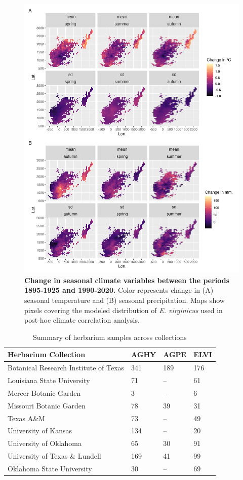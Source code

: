 \documentclass[11pt]{article}
\begin{document}
\begin{figure}[H]
	\centering
	\includegraphics[width = .8\linewidth]{../Plots/ELVI_climate_change_plot.png}
	\caption{\textbf{Change in seasonal climate variables between the periods 1895-1925 and 1990-2020.} Color represents change in (A) seasonal temperature and (B) seasonal precipitation. Maps show pixels covering the modeled distribution of \emph{E. virginicus} used in post-hoc climate correlation analysis.}
	\label{fig:ELVI_climate_covariates}
\end{figure}


	
	\begin{table}[h]
		\caption{Summary of herbarium samples across collections}
		\label{Table:herbaria}
		\centering
		\begin{tabular}{llll}\hline
			Herbarium Collection        & AGHY        & AGPE      &      ELVI\\ \hline
			Botanical Research Institute of Texas &   341   &    189&    176    \\
			Louisiana State University &     71  & --  &   61       \\
			Mercer Botanic Garden &   3    & --     &     6\\
			Missouri Botanic Garden& 78 & 39& 31\\
		    Texas A\&M &  73&-- & 49 \\
		    University of Kansas & 134 & -- &  20\\
		    University of Oklahoma & 65 &30&  91\\
		    University of Texas  \& Lundell   &  169& 41& 99\\		    				 			     			     
			Oklahoma State University&     30  &   --    &  69 \\ \hline
		\end{tabular}
		\bigskip{}

	\end{table}	
\end{document}

